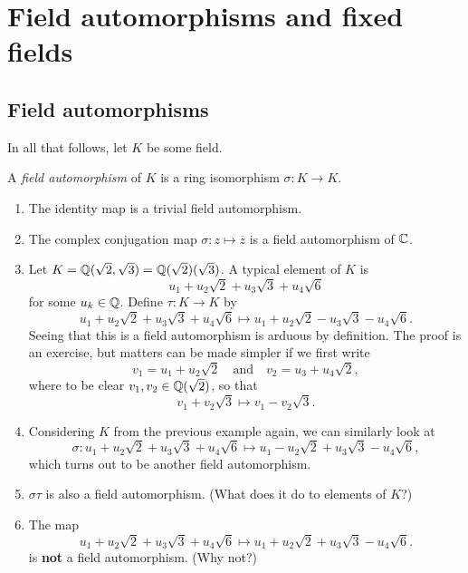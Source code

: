 \chapter{Field automorphisms and fixed fields}

\section{Field automorphisms}

In all that follows, let $K$ be some field.

\begin{definition}
    A \emph{field automorphism} of $K$ is a ring isomorphism $\sigma: K \to K$.
\end{definition}

\begin{example}
\label{exmp_field_auts}
    \begin{enumerate}
        \item The identity map is a trivial field automorphism.
        \item The complex conjugation map $\sigma : z \longmapsto \overline{z}$ is a field automorphism of $\mathbb{{C}}$.
        \item Let $K = \mathbb{{Q}}(\sqrt{2}, \sqrt{3}) = \mathbb{{Q}}(\sqrt{2})(\sqrt{3})$. A typical element of $K$ is
        \[
            u_1 + u_2 \sqrt{2} + u_3 \sqrt{3} + u_4 \sqrt{6}
        \]
        for some $u_k \in \mathbb{{Q}}$. Define $\tau: K \to K$ by
        \[
            u_1 + u_2 \sqrt{2} + u_3 \sqrt{3} + u_4 \sqrt{6} \longmapsto u_1 + u_2 \sqrt{2} - u_3 \sqrt{3} - u_4 \sqrt{6}.
        \]
        Seeing that this is a field automorphism is arduous by definition. The proof is an exercise, but matters can be made simpler if we first write
        \[
            v_1 = u_1 + u_2\sqrt{2}
            \quad \text{and} \quad
            v_2 = u_3 + u_4\sqrt{2},
        \]
        where to be clear $v_1, v_2 \in \mathbb{{Q}}(\sqrt{2})$, so that
        \[
            v_1 + v_2 \sqrt{3} \longmapsto v_1 - v_2 \sqrt{3}.
        \]
        \item Considering $K$ from the previous example again, we can similarly look at
        \[
            \sigma: u_1 + u_2 \sqrt{2} + u_3 \sqrt{3} + u_4 \sqrt{6} \longmapsto u_1 - u_2 \sqrt{2} + u_3 \sqrt{3} - u_4 \sqrt{6},
        \]
        which turns out to be another field automorphism.
        \item $\sigma \tau$ is also a field automorphism. (What does it do to elements of $K$?)
        \item The map
        \[
            u_1 + u_2 \sqrt{2} + u_3 \sqrt{3} + u_4 \sqrt{6} \longmapsto u_1 + u_2 \sqrt{2} + u_3 \sqrt{3} - u_4 \sqrt{6}.
        \]
        is \textbf{not} a field automorphism. (Why not?)
    \end{enumerate}
\end{example}

